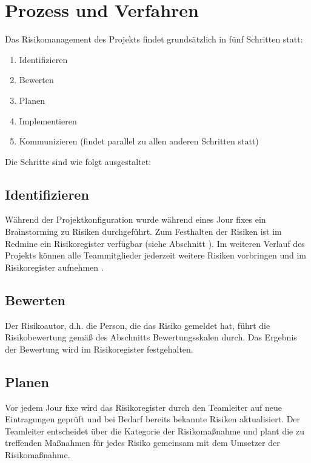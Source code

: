 \documentclass[a4paper,11pt,listof=numbered,glossary=totoc,parskip=half]{scrreprt}
\begin{document}
\section{Prozess und Verfahren}

Das Risikomanagement des Projekts findet grundsätzlich in fünf Schritten statt:

\begin{enumerate}
	\item Identifizieren
	\item Bewerten
	\item Planen
	\item Implementieren
	\item Kommunizieren (findet parallel zu allen anderen Schritten statt)
\end{enumerate}

Die Schritte sind wie folgt ausgestaltet:

\subsection{Identifizieren}

Während der Projektkonfiguration wurde während eines Jour fixes ein Brainstorming zu Risiken durchgeführt. Zum Festhalten der Risiken ist im Redmine ein Risikoregister verfügbar (siehe Abschnitt ). Im weiteren Verlauf des Projekts können alle Teammitglieder jederzeit weitere Risiken vorbringen und im Risikoregister aufnehmen .

\subsection{Bewerten}

Der Risikoautor, d.h. die Person, die das Risiko gemeldet hat, führt die Risikobewertung gemäß des Abschnitts Bewertungsskalen durch. Das Ergebnis der Bewertung wird im Risikoregister festgehalten.

\subsection{Planen}

Vor jedem Jour fixe wird das Risikoregister durch den Teamleiter auf neue Eintragungen geprüft und bei Bedarf bereits bekannte Risiken aktualisiert. Der Teamleiter entscheidet über die Kategorie der Risikomaßnahme und plant die zu treffenden Maßnahmen für jedes Risiko gemeinsam mit dem Umsetzer der Risikomaßnahme.
\end{document}
